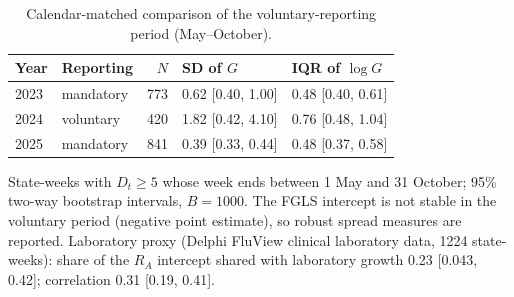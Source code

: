 \begin{table}[htbp]
\centering
\footnotesize
\caption{Calendar-matched comparison of the voluntary-reporting period (May--October).}
\label{tab:s4}
\begin{tabular}{llrll}
\toprule
Year & Reporting & $N$ & SD of $G$ & IQR of $\log G$ \\
\midrule
2023 & mandatory & 773 & 0.62 [0.40, 1.00] & 0.48 [0.40, 0.61] \\
2024 & voluntary & 420 & 1.82 [0.42, 4.10] & 0.76 [0.48, 1.04] \\
2025 & mandatory & 841 & 0.39 [0.33, 0.44] & 0.48 [0.37, 0.58] \\
\bottomrule
\end{tabular}
\par\smallskip
\begin{minipage}{0.95\linewidth}\scriptsize State-weeks with $D_t\ge 5$ whose week ends between 1 May and 31 October; 95\% two-way bootstrap intervals, $B=1000$. The FGLS intercept is not stable in the voluntary period (negative point estimate), so robust spread measures are reported. Laboratory proxy (Delphi FluView clinical laboratory data, 1224 state-weeks): share of the $R_A$ intercept shared with laboratory growth 0.23 [0.043, 0.42]; correlation 0.31 [0.19, 0.41].\end{minipage}
\end{table}
